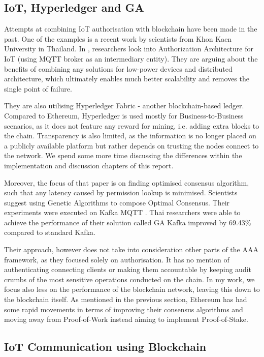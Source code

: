 \subsection{IoT, Hyperledger and GA}
Attempts at combining IoT authorisation with blockchain have been made in the past. One of the examples is a recent work by scientists from Khon Kaen University in Thailand. In \citet{klaokliang2018novel}, researchers look into Authorization Architecture for IoT (using MQTT broker as an intermediary entity). They are arguing about the benefits of combining any solutions for low-power devices and distributed architecture, which ultimately enables much better scalability and removes the single point of failure.

They are also utilising Hyperledger Fabric - another blockchain-based ledger. Compared to Ethereum, Hyperledger \cite{cachin2016architecture} is used mostly for Business-to-Business scenarios, as it does not feature any reward for mining, i.e. adding extra blocks to the chain. Transparency is also limited, as the information is no longer placed on a publicly available platform but rather depends on trusting the nodes connect to the network. We spend some more time discussing the differences within the implementation and discussion chapters of this report.

Moreover, the focus of that paper is on finding optimised consensus algorithm, such that any latency caused by permission lookup is minimised. Scientists suggest using Genetic Algorithms to compose Optimal Consensus. Their experiments were executed on Kafka MQTT \cite{waehner_2019}. Thai researchers were able to achieve the performance of their solution called GA Kafka improved by 69.43\% compared to standard Kafka.

Their approach, however does not take into consideration other parts of the AAA framework, as they focused solely on authorisation. It has no mention of authenticating connecting clients or making them accountable by keeping audit crumbs of the most sensitive operations conducted on the chain. In my work, we focus also less on the performance of the blockchain network, leaving this down to the blockchain itself. As mentioned in the previous section, Ethereum has had some rapid movements in terms of improving their consensus algorithms and moving away from Proof-of-Work instead aiming to implement Proof-of-Stake.

\subsection{IoT Communication using Blockchain}

